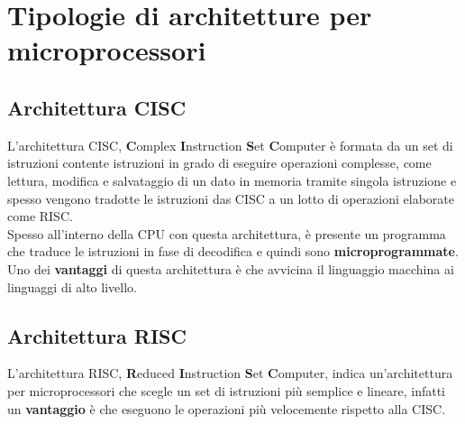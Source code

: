 \documentclass[12pt]{report}
\begin{document}
		\section{Tipologie di architetture per microprocessori}
			\subsection{Architettura CISC}
			L'architettura CISC, \textbf{C}omplex \textbf{I}nstruction \textbf{S}et \textbf{C}omputer è formata da un set di istruzioni contente istruzioni in grado di eseguire operazioni complesse, come lettura, modifica e salvataggio di un dato in memoria tramite singola istruzione e spesso vengono tradotte le istruzioni das CISC a un lotto di operazioni elaborate come RISC. \\
			Spesso all'interno della CPU con questa architettura, è presente un programma che traduce le istruzioni in fase di decodifica e quindi sono \textbf{microprogrammate}. \\
			Uno dei \textbf{vantaggi} di questa architettura è che avvicina il linguaggio macchina ai linguaggi di alto livello.
			\subsection{Architettura RISC}
			L'architettura RISC, \textbf{R}educed \textbf{I}nstruction \textbf{S}et \textbf{C}omputer, indica un'architettura per microprocessori che scegle un set di istruzioni più semplice e lineare, infatti un \textbf{vantaggio} è che eseguono le operazioni più velocemente rispetto alla CISC.
\end{document}
